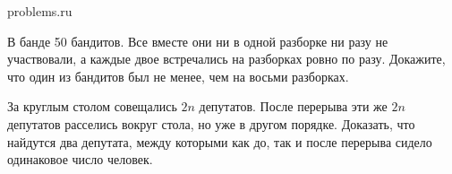 \documentclass[11pt, a4paper]{problems_template}
\begin{document}
\begin{titlepage}
  \begin{center}
	\Huge{problems.ru}
  \end{center}
\end{titlepage}   

\begin{exercise}
В банде 50 бандитов. Все вместе они ни в одной разборке ни разу не участвовали, а каждые двое встречались на разборках ровно по разу. Докажите, что один из бандитов был не менее, чем на восьми разборках.
\end{exercise}

\begin{exercise}
За круглым столом совещались $2n$ депутатов. После перерыва эти же $2n$ депутатов расселись вокруг стола, но уже в другом порядке. Доказать, что найдутся два депутата, между которыми как до, так и после перерыва сидело одинаковое число человек.
\end{exercise}
\end{document}
